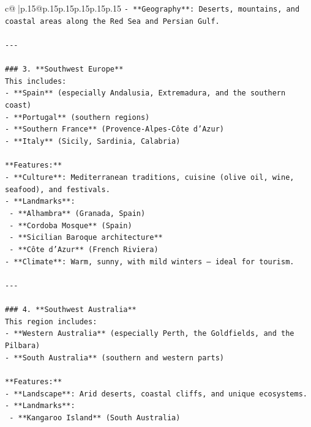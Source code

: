 \documentclass{article}
\begin{document}
{\begin{supertabular}{c@{$\;$}|p{.15\linewidth}@{}p{.15\linewidth}p{.15\linewidth}p{.15\linewidth}p{.15\linewidth}p{.15\linewidth}}
{{{\texttt{{-} **Geography**: Deserts, mountains, and coastal areas along the Red Sea and Persian Gulf.} \\
\\ 
\texttt{{-}{-}{-}} \\
\\ 
\texttt{\#\#\# 3. **Southwest Europe**} \\
\texttt{This includes:} \\
\texttt{{-} **Spain** (especially Andalusia, Extremadura, and the southern coast)} \\
\texttt{{-} **Portugal** (southern regions)} \\
\texttt{{-} **Southern France** (Provence{-}Alpes{-}Côte d’Azur)} \\
\texttt{{-} **Italy** (Sicily, Sardinia, Calabria)} \\
\\ 
\texttt{**Features:**} \\
\texttt{{-} **Culture**: Mediterranean traditions, cuisine (olive oil, wine, seafood), and festivals.} \\
\texttt{{-} **Landmarks**:} \\
\texttt{  {-} **Alhambra** (Granada, Spain)} \\
\texttt{  {-} **Cordoba Mosque** (Spain)} \\
\texttt{  {-} **Sicilian Baroque architecture**} \\
\texttt{  {-} **Côte d’Azur** (French Riviera)} \\
\texttt{{-} **Climate**: Warm, sunny, with mild winters — ideal for tourism.} \\
\\ 
\texttt{{-}{-}{-}} \\
\\ 
\texttt{\#\#\# 4. **Southwest Australia**} \\
\texttt{This region includes:} \\
\texttt{{-} **Western Australia** (especially Perth, the Goldfields, and the Pilbara)} \\
\texttt{{-} **South Australia** (southern and western parts)} \\
\\ 
\texttt{**Features:**} \\
\texttt{{-} **Landscape**: Arid deserts, coastal cliffs, and unique ecosystems.} \\
\texttt{{-} **Landmarks**:} \\
\texttt{  {-} **Kangaroo Island** (South Australia)} \\
}}}
\end{supertabular}}
\end{document}
